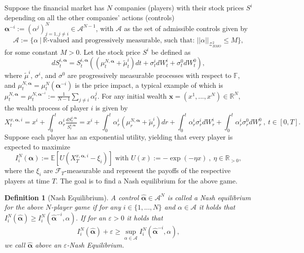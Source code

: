 \documentclass[10pt,a4paper]{article}
\newcommand{\R}{\mathbb{R}}
\newcommand{\be}{\begin{equation}}
\newcommand{\ee}{\end{equation}}
\newcommand{\MA}{{\mathcal{A}}}
\newcommand{\Balpha}{\boldsymbol{\alpha}}
\newcommand{\Bx}{{\mathbf{x}}}
\theoremstyle{plain}
\newtheorem{Definition}[Theorem]{Definition}
\theoremstyle{definition}
\numberwithin{equation}{section}
\begin{document}
Suppose the financial market has $N$ companies (players) with their stock prices $S^i$ depending on all the other companies' actions (controls) $\Balpha^{-i}:=(\alpha^j)_{j=1,j\neq i}^N \in \MA^{N-1}$, with $\MA$ as the set of admissible controls given by
\begin{equation}
\label{equ:2.12}
\mathcal{A} := \bigl\{\alpha \ \vert \ \mathbb{R}\text{-valued and progressively measurable, such that: } ||\alpha||_{\mathcal{Z}_{BMO}^{2}} \leq M \bigr\},
\end{equation}
for some constant $M>0.$ Let the stock price $S^i$ be defined as
\be
\label{equ:2.4}
dS_{t}^{i,\Balpha} = S_{t}^{i,\Balpha}((\mu_{t}^{N,\Balpha}+\tilde{\mu}_{t}^{i})dt+\sigma_{t}^{i}dW_{t}^{i}+\sigma_{t}^{0}dW_{t}^{0}),
\ee
where $\tilde{\mu}^{i}$, $\sigma^{i}$, and $\sigma^{0}$ are progressively measurable processes with respect to $\mathbb{F}$, and $\mu_{t}^{N,\Balpha}=\mu^N_t(\Balpha^{-i})$ is the price impact, a typical example of which is $\mu_{t}^{N,\Balpha}=\mu^{N,\Balpha^{-i}}_t := \frac{1}{N-1} \sum_{j \neq i} \alpha_{t}^{j} $.
For any initial wealth $\Bx=(x^1, ..., x^N) \in \R^N,$ the wealth process of player $i$ is given by
\begin{equation}
\label{equ:2.5}
X_{t}^{x, \Balpha, i} = x^i + \int_{0}^{t}\alpha_{r}^{i}\tfrac{dS_{r}^{i,\Balpha}}{S_{r}^{i,\Balpha}} = x^i + \int_{0}^{t}{\alpha_{r}^{i}(\mu_{r}^{N,\Balpha}+\tilde{\mu}_{r}^{i})dr} + \int_{0}^{t}{\alpha_{r}^{i}\sigma_{r}^{i}dW_{r}^{i}} + \int_{0}^{t}\alpha_{r}^{i}\sigma_{r}^{0}dW_{r}^{0} \ , \ t \in [0,T].
\end{equation}
Suppose each player has an exponential utility, yielding that every player is expected to maximize
\begin{equation}
\label{equ:2.6}
I_{i}^{N}(\Balpha) := \mathbb{E}[U(X_{T}^{x,\Balpha,i}-\xi_{i})] \text{   with   } U(x) := -\exp(-\eta x) \ , \ \eta \in \mathbb{R}_{>0},
\end{equation}
where the $\xi_{i}$ are $\mathcal{F}_{T}$-measurable and represent the payoffs of the respective players at time $T$. 
The goal is to find a Nash equilibrium for the above game. 

\begin{Definition}[Nash Equilibrium]
\label{DefEpsNE}
A control $\hat{\Balpha} \in \mathcal{A}^{N}$ is called a Nash equilibrium for the above $N$-player game if for any $i \in \{1,...,N\}$ and $\alpha \in \mathcal{A}$ it holds that
$
I_{i}^{N}(\hat{\Balpha})  \geq I_{i}^{N}(\hat{\Balpha}^{-i},\alpha).
$ If for an $\varepsilon>0$ it holds that 
\begin{equation}
\label{equ:2.7}
I_{i}^{N}(\hat{\Balpha}) + \varepsilon \geq \sup_{\alpha \in \MA} I_{i}^{N}(\hat{\Balpha}^{-i},\alpha),
\end{equation}
we call $\hat{\Balpha}$ above an $\varepsilon$-Nash Equilibrium.
\end{Definition}
\end{document}
